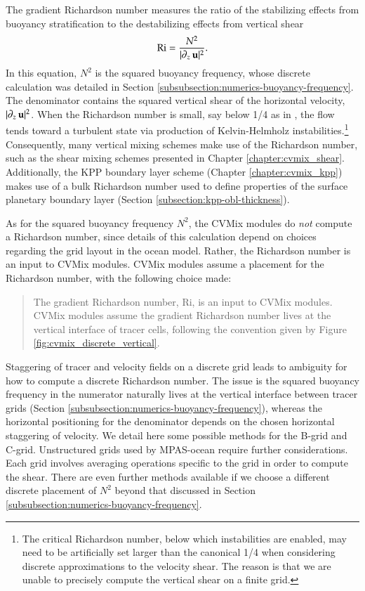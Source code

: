 The gradient Richardson number measures the ratio of the stabilizing
effects from buoyancy stratification to the destabilizing effects from
vertical shear
\begin{equation}
  \mbox{Ri}= \frac{N^{2} }{ |\partial_{z} \, {\bf u}|^{2} }.
\label{eq:flux-Richardson-elements}
\end{equation}
In this equation, $N^{2}$ is the squared buoyancy frequency, whose
discrete calculation was detailed in Section
\ref{subsubsection:numerics-buoyancy-frequency}.  The denominator
contains the squared vertical shear of the horizontal velocity,
$|\partial_{z} \, {\bf u}|^{2}$.  When the Richardson number is small,
say below 1/4 as in \cite{miles1961}, the flow tends toward a
turbulent state via production of Kelvin-Helmholz
instabilities.\footnote{The critical Richardson number, below which
  instabilities are enabled, may need to be artificially set larger
  than the canonical 1/4 when considering discrete approximations to
  the velocity shear.  The reason is that we are unable to precisely
  compute the vertical shear on a finite grid.}  Consequently, many
vertical mixing schemes make use of the Richardson number, such as the
shear mixing schemes presented in Chapter \ref{chapter:cvmix_shear}.
Additionally, the KPP boundary layer scheme (Chapter
\ref{chapter:cvmix_kpp}) makes use of a bulk Richardson number used to
define properties of the surface planetary boundary layer (Section
\ref{subsection:kpp-obl-thickness}).

As for the squared buoyancy frequency $N^{2}$, the CVMix modules do
{\it not} compute a Richardson number, since details of this
calculation depend on choices regarding the grid layout in the ocean
model.  Rather, the Richardson number is an input to CVMix modules.
CVMix modules assume a placement for the Richardson number, with the
following choice made:
\begin{quote}
  {\sf The gradient Richardson number, $\mbox{Ri}$, is an input to
    CVMix modules.  CVMix modules assume the gradient Richardson
    number lives at the vertical interface of tracer cells, following
    the convention given by Figure
    \ref{fig:cvmix_discrete_vertical}.}
\end{quote}

Staggering of tracer and velocity fields on a discrete grid leads to
ambiguity for how to compute a discrete Richardson number.  The issue
is the squared buoyancy frequency in the numerator naturally lives at
the vertical interface between tracer grids (Section
\ref{subsubsection:numerics-buoyancy-frequency}), whereas the
horizontal positioning for the denominator depends on the chosen
horizontal staggering of velocity.  We detail here some possible
methods for the B-grid and C-grid.  Unstructured grids used by
MPAS-ocean require further considerations.  Each grid involves
averaging operations specific to the grid in order to compute the
shear.  There are even further methods available if we choose a
different discrete placement of $N^{2}$ beyond that discussed in
Section \ref{subsubsection:numerics-buoyancy-frequency}.



